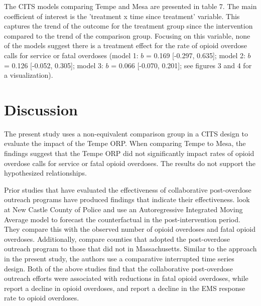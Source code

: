 The CITS models comparing Tempe and Mesa are presented in table 7. The main coefficient of interest is the 'treatment x time since treatment' variable. This captures the trend of the outcome for the treatment group since the intervention compared to the trend of the comparison group. Focusing on this variable, none of the models suggest there is a treatment effect for the rate of opioid overdose calls for service or fatal overdoses (model 1: \(b\) = 0.169 [-0.297, 0.635]; model 2: \(b\) = 0.126 [-0.052, 0.305]; model 3: \(b\) = 0.066 [-0.070, 0.201]; see figures 3 and 4 for a visualization).  

\section{\centering Discussion}
The present study uses a non-equivalent comparison group in a CITS design to evaluate the impact of the Tempe ORP. When comparing Tempe to Mesa, the findings suggest that the Tempe ORP did not significantly impact rates of opioid overdose calls for service or fatal opioid overdoses. The results do not support the hypothesized relationships. 

Prior studies that have evaluated the effectiveness of collaborative post-overdose outreach programs have produced findings that indicate their effectiveness. \textcite{donnelly_law_2022} look at New Castle County of Police and use an Autoregressive Integrated Moving Average model to forecast the counterfactual in the post-intervention period. They compare this with the observed number of opioid overdoses and fatal opioid overdoses. Additionally, \textcite{xuan_association_2023} compare counties that adopted the post-overdose outreach program to those that did not in Massachusetts. Similar to the approach in the present study, the authors use a comparative interrupted time series design. Both of the above studies find that the collaborative post-overdose outreach efforts were associated with reductions in fatal opioid overdoses, while \textcite{donnelly_law_2022} report a decline in opioid overdoses, and \textcite{xuan_association_2023} report a decline in the EMS response rate to opioid overdoses. 

